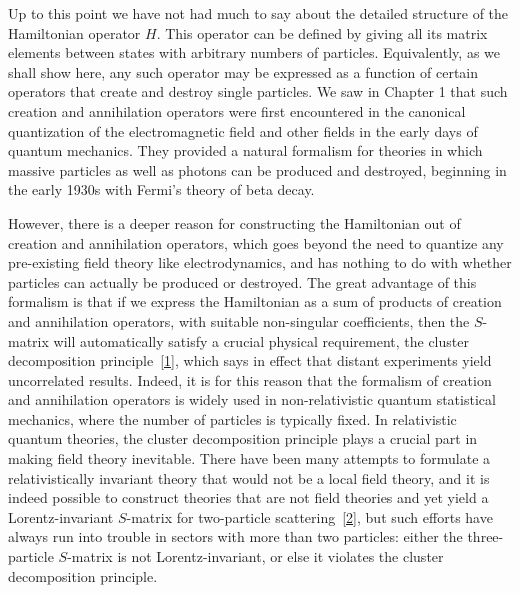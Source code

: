 
Up to this point we have not had much to say about the detailed structure
of the Hamiltonian operator $H$. This operator can be defined by giving
all its matrix elements between states with arbitrary numbers of particles.
Equivalently, as we shall show here, any such operator may be expressed
as a function of certain operators that create and destroy single particles.
We saw in Chapter 1 that such creation and annihilation operators were
first encountered in the canonical quantization of the electromagnetic field
and other fields in the early days of quantum mechanics. They provided
a natural formalism for theories in which massive particles as well as
photons can be produced and destroyed, beginning in the early 1930s with
Fermi's theory of beta decay.

However, there is a deeper reason for constructing the Hamiltonian out
of creation and annihilation operators, which goes beyond the need to
quantize any pre-existing field theory like electrodynamics, and has nothing
to do with whether particles can actually be produced or destroyed. The
great advantage of this formalism is that if we express the Hamiltonian
as a sum of products of creation and annihilation operators, with suitable
non-singular coefficients, then the $S$-matrix will automatically satisfy a
crucial physical requirement, the cluster decomposition principle~\hyperref[ref:4.1]{[1]}, which
says in effect that distant experiments yield uncorrelated results. Indeed, it
is for this reason that the formalism of creation and annihilation operators
is widely used in non-relativistic quantum statistical mechanics, where the
number of particles is typically fixed. In relativistic quantum theories, the
cluster decomposition principle plays a crucial part in making field theory
inevitable. There have been many attempts to formulate a relativistically
invariant theory that would not be a local field theory, and it is indeed
possible to construct theories that are not field theories and yet yield
a Lorentz-invariant $S$-matrix for two-particle scattering~\hyperref[ref:4.2]{[2]}, but such efforts
have always run into trouble in sectors with more than two particles: either
the three-particle $S$-matrix is not Lorentz-invariant, or else it violates the
cluster decomposition principle.

